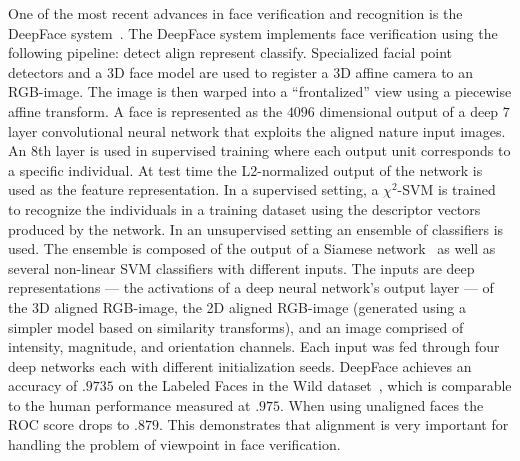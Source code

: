         One of the most recent advances in face verification and
          recognition is the DeepFace
          system~\cite{taigman_deepface_2014}.
        The DeepFace system implements face verification using the
          following pipeline:
        detect \rpipe{} align \rpipe{} represent \rpipe{} classify.
        Specialized facial point detectors and a 3D face model are used
          to register a 3D affine camera to an RGB-image.
        The image is then warped into a ``frontalized'' view using a
          piecewise affine transform.
        A face is represented as the $4096$ dimensional output of a
          deep $7$ layer convolutional neural network that exploits the
          aligned nature input images.
        An 8th layer is used in supervised training where each output
          unit corresponds to a specific individual.
        At test time the L2-normalized output of the network is used as
          the feature representation.
        In a supervised setting, a $\chi^2$-SVM is trained to recognize
          the individuals in a training dataset using the descriptor
          vectors produced by the network.
        In an unsupervised setting an ensemble of classifiers is used.
        The ensemble is composed of the output of a Siamese
          network~\cite{chopra_learning_2005} as well as several
          non-linear SVM classifiers with different inputs.
        The inputs are deep representations --- the activations of a
          deep neural network's output layer --- of the 3D aligned
          RGB-image, the 2D aligned RGB-image (generated using a simpler
          model based on similarity transforms), and an image comprised
          of intensity, magnitude, and orientation channels.
        Each input was fed through four deep networks each with
          different initialization seeds.
        DeepFace achieves an accuracy of $.9735$ on the Labeled Faces
          in the Wild dataset~\cite{huang_labeled_2007}, which is
          comparable to the human performance measured at $.975$.
        When using unaligned faces the ROC score drops to $.879$.
        This demonstrates that alignment is very important for handling
          the problem of viewpoint in face verification.

